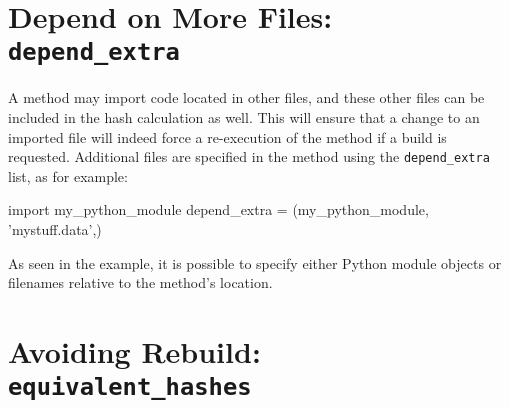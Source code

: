 \section{Depend on More Files:  \texttt{depend\_extra}}

A method may import code located in other files, and these other files
can be included in the hash calculation as well.  This will ensure
that a change to an imported file will indeed force a re-execution of
the method if a build is requested.  Additional files are specified in
the method using the \texttt{depend\_extra} list, as for example:
\begin{python}
import my_python_module
depend_extra = (my_python_module, 'mystuff.data',)
\end{python}
As seen in the example, it is possible to specify either Python module
objects or filenames relative to the method's location.



\section{Avoiding Rebuild: \texttt{equivalent\_hashes}}

